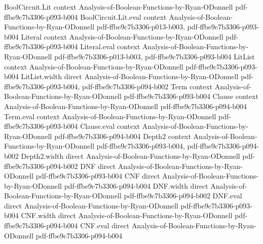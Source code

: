 \begin{lemma}
\label{DNF.dual_eval}
\leanok
{}
\proofstep
  {BoolCircuit.Lit}
  {context}
  {Analysis-of-Boolean-Functions-by-Ryan-ODonnell}
  {pdf-ffbe9c7b3306-p093-b004}
\proofstep
  {BoolCircuit.Lit.eval}
  {context}
  {Analysis-of-Boolean-Functions-by-Ryan-ODonnell}
  {pdf-ffbe9c7b3306-p013-b003,
    pdf-ffbe9c7b3306-p093-b004}
\proofstep
  {Literal}
  {context}
  {Analysis-of-Boolean-Functions-by-Ryan-ODonnell}
  {pdf-ffbe9c7b3306-p093-b004}
\proofstep
  {Literal.eval}
  {context}
  {Analysis-of-Boolean-Functions-by-Ryan-ODonnell}
  {pdf-ffbe9c7b3306-p013-b003,
    pdf-ffbe9c7b3306-p093-b004}
\proofstep
  {LitList}
  {context}
  {Analysis-of-Boolean-Functions-by-Ryan-ODonnell}
  {pdf-ffbe9c7b3306-p093-b004}
\proofstep
  {LitList.width}
  {direct}
  {Analysis-of-Boolean-Functions-by-Ryan-ODonnell}
  {pdf-ffbe9c7b3306-p093-b004,
    pdf-ffbe9c7b3306-p094-b002}
\proofstep
  {Term}
  {context}
  {Analysis-of-Boolean-Functions-by-Ryan-ODonnell}
  {pdf-ffbe9c7b3306-p093-b004}
\proofstep
  {Clause}
  {context}
  {Analysis-of-Boolean-Functions-by-Ryan-ODonnell}
  {pdf-ffbe9c7b3306-p094-b004}
\proofstep
  {Term.eval}
  {context}
  {Analysis-of-Boolean-Functions-by-Ryan-ODonnell}
  {pdf-ffbe9c7b3306-p093-b004}
\proofstep
  {Clause.eval}
  {context}
  {Analysis-of-Boolean-Functions-by-Ryan-ODonnell}
  {pdf-ffbe9c7b3306-p094-b004}
\proofstep
  {Depth2}
  {context}
  {Analysis-of-Boolean-Functions-by-Ryan-ODonnell}
  {pdf-ffbe9c7b3306-p093-b004,
    pdf-ffbe9c7b3306-p094-b002}
\proofstep
  {Depth2.width}
  {direct}
  {Analysis-of-Boolean-Functions-by-Ryan-ODonnell}
  {pdf-ffbe9c7b3306-p094-b002}
\proofstep
  {DNF}
  {direct}
  {Analysis-of-Boolean-Functions-by-Ryan-ODonnell}
  {pdf-ffbe9c7b3306-p093-b004}
\proofstep
  {CNF}
  {direct}
  {Analysis-of-Boolean-Functions-by-Ryan-ODonnell}
  {pdf-ffbe9c7b3306-p094-b004}
\proofstep
  {DNF.width}
  {direct}
  {Analysis-of-Boolean-Functions-by-Ryan-ODonnell}
  {pdf-ffbe9c7b3306-p094-b002}
\proofstep
  {DNF.eval}
  {direct}
  {Analysis-of-Boolean-Functions-by-Ryan-ODonnell}
  {pdf-ffbe9c7b3306-p093-b004}
\proofstep
  {CNF.width}
  {direct}
  {Analysis-of-Boolean-Functions-by-Ryan-ODonnell}
  {pdf-ffbe9c7b3306-p094-b004}
\proofstep
  {CNF.eval}
  {direct}
  {Analysis-of-Boolean-Functions-by-Ryan-ODonnell}
  {pdf-ffbe9c7b3306-p094-b004}

\end{lemma}
